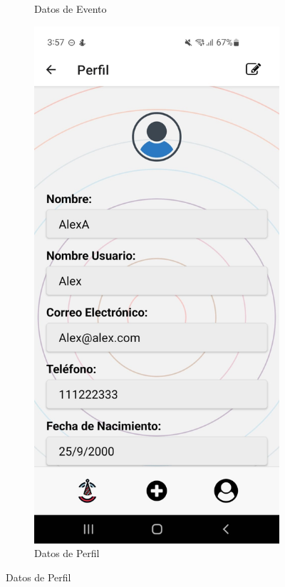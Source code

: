 \begin{figure}[H]
\begin{subfigure}{0.45\textwidth}
        \caption{Datos de Evento}
        \label{fig:img5}
    \end{subfigure}%
    \hfill
    \begin{subfigure}{0.45\textwidth}
        \centering
        \includegraphics[width=\linewidth]{imagenes/Capturas/DatosPerfil.jpeg}
        \caption{Datos de Perfil}
        \label{fig:img6}
    \end{subfigure}
\end{figure}
\vspace*{\fill}

